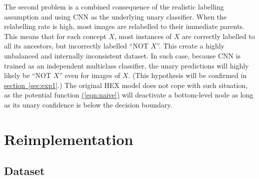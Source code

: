 \documentclass[11pt,a4paper]{article}
\begin{document}
The second problem is a combined consequence of the realistic labelling assumption and using CNN as the underlying unary classifier. When the relabelling rate is high, most images are relabelled to their immediate parents. This means that for each concept $X$, most instances of $X$ are correctly labelled to all its ancestors, but incorrectly labelled ``NOT $X$''. This create a highly unbalanced and internally inconsistent dataset. In such case, because CNN is trained as an independent multiclass classifier, the unary predictions will highly likely be ``NOT $X$'' even for images of $X$. (This hypothesis will be confirmed in \hyperref[sec:exp1]{section~\ref{sec:exp1}}.) The original HEX model does not cope with such situation, as the potential function \hyperref[eqn:naive]{(\ref{eqn:naive})} will deactivate a bottom-level node as long as its unary confidence is below the decision boundary.

\clearpage
\section{Reimplementation}
\subsection{Dataset}
\label{sec:data}
\end{document}
